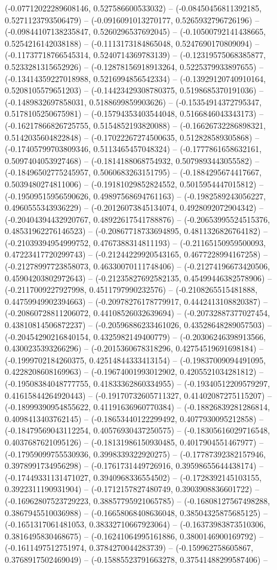 (-0.07712022289608146, 0.527586600533032) -- (-0.08450456811392185, 0.5271123793506479) -- (-0.0916091013270177, 0.5265932796726196) -- (-0.09844107138235847, 0.5260296537692045) -- (-0.10500792141438665, 0.5254216142038188) -- (-0.1113173184865048, 0.5247690170809094) -- (-0.11737718766545314, 0.5240714369783139) -- (-0.12319575068385877, 0.5233281315652926) -- (-0.12878156918913264, 0.5225379933897655) -- (-0.13414359227018988, 0.5216994856542334) -- (-0.13929120740910164, 0.5208105579651203) -- (-0.14423429308780375, 0.5198685370191036) -- (-0.1489832697858031, 0.5188699859903626) -- (-0.15354914372795347, 0.5178105250675981) -- (-0.15794353403544048, 0.5166846043343173) -- (-0.16217866826725755, 0.5154852193820088) -- (-0.16626732286898321, 0.5142035604822848) -- (-0.17022267274500635, 0.512828589305868) -- (-0.17405799703809346, 0.5113465457048324) -- (-0.1777861658632161, 0.5097404053927468) -- (-0.1814188068754932, 0.5079893443055582) -- (-0.18496502775245957, 0.5060683263151795) -- (-0.1884295674417667, 0.5039480274811006) -- (-0.19181029852824552, 0.5015954447015812) -- (-0.19509515956590626, 0.49897568694761163) -- (-0.1982589243056227, 0.4960555343936229) -- (-0.20126073845134074, 0.4928092072904342) -- (-0.20404394432920767, 0.48922617541788876) -- (-0.20653995524515376, 0.48531962276146523) -- (-0.20867718733694895, 0.4811326826764182) -- (-0.21039394954999752, 0.4767388314811193) -- (-0.21165150959500093, 0.47223417720299743) -- (-0.21244229920543165, 0.4677228994167258) -- (-0.21278997723858073, 0.46330070111748406) -- (-0.21274196673420506, 0.45904203802972643) -- (-0.21235827692582135, 0.45499446382578906) -- (-0.2117009227927998, 0.4511797990232576) -- (-0.2108265515481888, 0.44759949902394663) -- (-0.20978276178779917, 0.4442413108820387) -- (-0.20860728811206072, 0.44108526032639694) -- (-0.20732887377027454, 0.43810814506872237) -- (-0.20596886233461026, 0.43528648289057503) -- (-0.20454290216840154, 0.4325982149400779) -- (-0.20306246398913566, 0.4300235393266296) -- (-0.2015360678318296, 0.42754519691698184) -- (-0.1999702184260375, 0.42514844333413154) -- (-0.19837009094491095, 0.4228208608169963) -- (-0.19674001993012902, 0.4205521034281812) -- (-0.19508384048777755, 0.41833362860334955) -- (-0.19340512209579297, 0.41615844264920443) -- (-0.19170732605711327, 0.41402087275115207) -- (-0.18999390954855622, 0.41191636960770384) -- (-0.18826839281286814, 0.4098413403762145) -- (-0.18653440122299492, 0.4077930095212858) -- (-0.18479569043112254, 0.40576930437250575) -- (-0.18305616029716548, 0.4037687621095126) -- (-0.18131986150930485, 0.4017904551467977) -- (-0.17959099755530936, 0.3998339322920275) -- (-0.17787392382157946, 0.3978991734956298) -- (-0.1761731449726916, 0.39598655644438174) -- (-0.17449331131471027, 0.3940968336554502) -- (-0.1728392145103155, 0.3922311190931904) -- (-0.1712157827480749, 0.3903908836601722) -- (-0.16962807523729223, 0.38857795921065785) -- (-0.16808127567498288, 0.3867945510036988) -- (-0.16658068408636048, 0.38504325875685125) -- (-0.1651317061481053, 0.38332710667923064) -- (-0.16373983873510306, 0.3816495830468675) -- (-0.16241064995161886, 0.3800146900169792) -- (-0.1611497512751974, 0.3784270044283739) -- (-0.159962758605867, 0.3768917502469049) -- (-0.15885523791663278, 0.37541488299587406) -- 